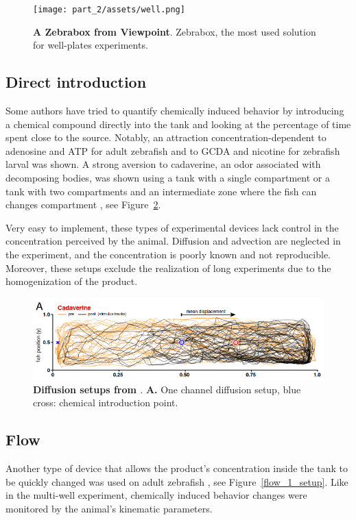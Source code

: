     \begin{figure}[h]
      \centering
      \texttt{[image: part\_2/assets/well.png]}
      \caption{\textbf{A Zebrabox from Viewpoint}.  Zebrabox, the most used solution for well-plates experiments.}
      \label{zebrabox}
    \end{figure}

    \subsection{Direct introduction}
    Some authors have tried to quantify chemically induced behavior by introducing a chemical compound directly into the tank and looking at the percentage of time spent close to the source. Notably, an attraction concentration-dependent to adenosine and ATP for adult zebrafish\cite{wakisaka2017adenosine} and to GCDA and nicotine for zebrafish larval \cite{krishnan2014right} was shown. A strong aversion to cadaverine, an odor associated with decomposing bodies, was shown using a tank with a single compartment or a tank with two compartments and an intermediate zone where the fish can changes compartment \cite{hussain2013high}, see Figure~\ref{diffusion_setup}.

    Very easy to implement, these types of experimental devices lack control in the concentration perceived by the animal. Diffusion and advection are neglected in the experiment, and the concentration is poorly known and not reproducible. Moreover, these setups exclude the realization of long experiments due to the homogenization of the product.

    \begin{figure}[h]
      \centering
      \includegraphics[width=1\textwidth]{part_2/assets/diffusion.png}
      \caption{\textbf{Diffusion setups from \cite{hussain2013high}}. \textbf{A.} One channel diffusion setup, blue cross: chemical introduction point.}
      \label{diffusion_setup}
    \end{figure}

    \subsection{Flow}
    Another type of device that allows the product's concentration inside the tank to be quickly changed was used on adult zebrafish \cite{kermen2020stimulus}, see Figure~\ref{flow_1_setup}. Like in the multi-well experiment, chemically induced behavior changes were monitored by the animal's kinematic parameters.

